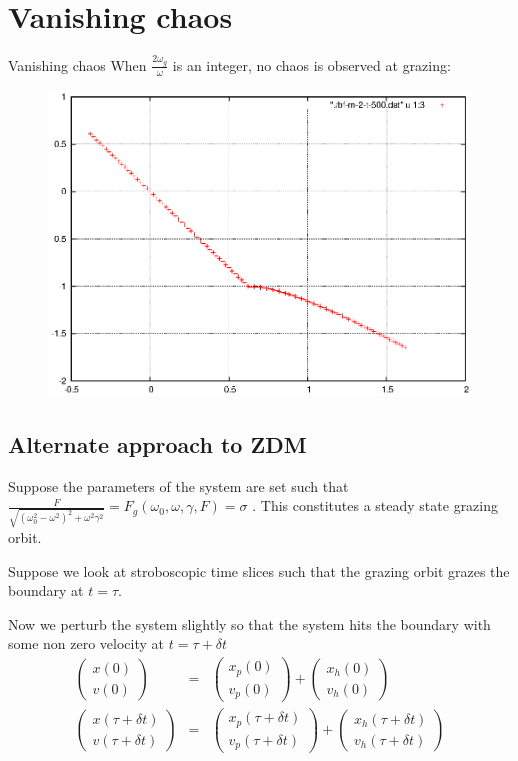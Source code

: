 \documentclass[xcolor=x11names,compress]{beamer}
\renewcommand{\(}{\begin{columns}}
\renewcommand{\)}{\end{columns}}
\newcommand{\<}[1]{\begin{column}{#1}}
\renewcommand{\>}{\end{column}}
\newcommand{\colv}[2]{\begin{pmatrix}#1\\#2\end{pmatrix}}
\begin{document}
\section{Vanishing chaos}
\begin{frame}{Vanishing chaos}
When $\frac{2\omega_g}{\omega}$ is an integer, no chaos is observed at grazing:
\begin{figure}
\begin{center}
\includegraphics[width=0.9\columnwidth]{chaos-vanish-m-2}
\end{center}
\end{figure}
\end{frame}

\begin{frame}
\section{Alternate approach to ZDM}
Suppose the parameters of the system are set such that 
$\frac{F}{\sqrt{(\omega_0^2-\omega^2)^2+\omega^2\gamma^2}}=F_g(\omega_0,\omega,\gamma,F)=\sigma$
. This constitutes a steady state grazing orbit.  \\
 \vspace{1em}

Suppose we look at stroboscopic time slices such that the grazing orbit grazes 
the boundary at $t=\tau$.  \\
\vspace{1em}

Now we perturb the system slightly so that the system hits the boundary with 
some non zero velocity at $t=\tau+\delta t$\\

\begin{eqnarray*}
\colv{x(0)}{v(0)}&=&\colv{x_p(0)}{v_p(0)}+\colv{x_h(0)}{v_h(0)}\\
\colv{x(\tau+\delta t)}{v(\tau+\delta t)}&=&\colv{x_p(\tau+\delta t)}{v_p(\tau+\delta t)}+\colv{x_h(\tau+\delta t)}{v_h(\tau+\delta t)}
\end{eqnarray*}
\end{frame}
\end{document}
